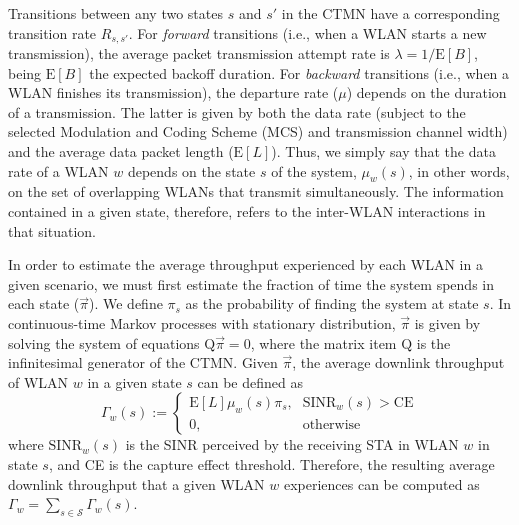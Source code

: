 \documentclass[preprint,12pt]{elsarticle}
\begin{document}
Transitions between any two states $s$ and $s'$ in the CTMN have a corresponding transition rate $R_{s,s'}$. For \textit{forward} transitions (i.e., when a WLAN starts a new transmission), the average packet transmission attempt rate is $\lambda = 1/\text{E}[B]$, being $\text{E}[B]$ the expected backoff duration. For \textit{backward} transitions (i.e., when a WLAN finishes its transmission), the departure rate ($\mu$) depends on the duration of a transmission. The latter is given by both the data rate (subject to the selected Modulation and Coding Scheme (MCS) and transmission channel width) and the average data packet length ($\text{E}[L]$). Thus, we simply say that the data rate of a WLAN $w$ depends on the state $s$ of the system, $\mu_{w}(s)$, in other words, on the set of overlapping WLANs that transmit simultaneously. The information contained in a given state, therefore, refers to the inter-WLAN interactions in that situation.

In order to estimate the average throughput experienced by each WLAN in a given scenario, we must first estimate the fraction of time the system spends in each state ($\vec{\pi}$). We define $\pi_s$ as the probability of finding the system at state $s$. In continuous-time Markov processes with stationary distribution, $\vec{\pi}$ is given by solving the system of equations $\text{Q} \vec{\pi} = 0$, where the matrix item $\text{Q}$ is the infinitesimal generator of the CTMN.
Given $\vec{\pi}$, the average downlink throughput of WLAN $w$ in a given state $s$ can be defined as
\begin{equation*}
\Gamma_{w}(s) := \begin{cases} 
\text{E}[L]  \mu_w(s) \pi_s  \text{,}  & \text{SINR}_{w}(s) > \text{CE} \\
0 \text{,} & \text{otherwise}
\end{cases}
\end{equation*}
where $\text{SINR}_{w}(s)$ is the SINR perceived by the receiving STA in WLAN $w$ in state $s$, and CE is the capture effect threshold.	Therefore, the resulting average downlink throughput that a given WLAN $w$ experiences can be computed as $\Gamma_w = \sum_{s \in \mathcal{S}}^{}\Gamma_{w}(s) $.

\end{document}
